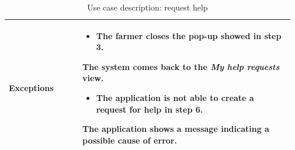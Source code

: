\begin{table}[H]
\begin{tabular}{@{}p{0.25\linewidth} p{0.72\linewidth}@{}}
		\textbf{Exceptions}         & \begin{itemize}[leftmargin=.4cm,noitemsep,topsep=0pt,before=\vspace{-3mm}]
		   \item The farmer closes the pop-up showed in step 3.
		\end{itemize}
	    The system comes back to the \textit{My help requests} view.
	    \begin{itemize}[leftmargin=.4cm,noitemsep,topsep=0pt]
		   \item The application is not able to create a request for help in step 6. 
		\end{itemize}
		The application shows a message indicating a possible cause of error.\\
		\bottomrule
	\end{tabular}
	\caption{Use case description: request help} 
\end{table}

